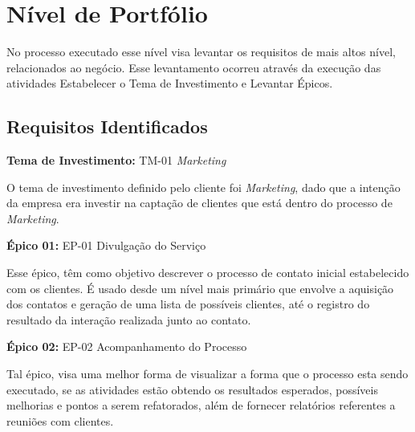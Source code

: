 \chapter[Nível de Portfólio]{Nível de Portfólio}

No processo executado esse nível visa levantar os requisitos de mais altos nível, relacionados ao negócio. Esse levantamento
ocorreu através da execução das atividades Estabelecer o Tema de Investimento e Levantar Épicos.

\section{Requisitos Identificados}

\textbf{Tema de Investimento:} TM-01 \textit{Marketing}

O tema de investimento definido pelo cliente foi \textit{Marketing}, dado que a intenção da empresa era investir na captação de clientes que está
dentro do processo de \textit{Marketing}.

\textbf{Épico 01:} EP-01 Divulgação do Serviço

Esse épico, têm como objetivo descrever o processo de contato inicial estabelecido com os clientes. É usado desde um nível mais primário que envolve a aquisição dos contatos e geração de uma lista de possíveis clientes, até o registro do resultado da interação realizada junto ao contato.


\textbf{Épico 02:} EP-02 Acompanhamento do Processo

Tal épico, visa uma melhor forma de visualizar a forma que o processo esta sendo executado, se as atividades estão obtendo os resultados esperados, possíveis melhorias e pontos a serem refatorados, além de fornecer relatórios referentes a reuniões com clientes.
